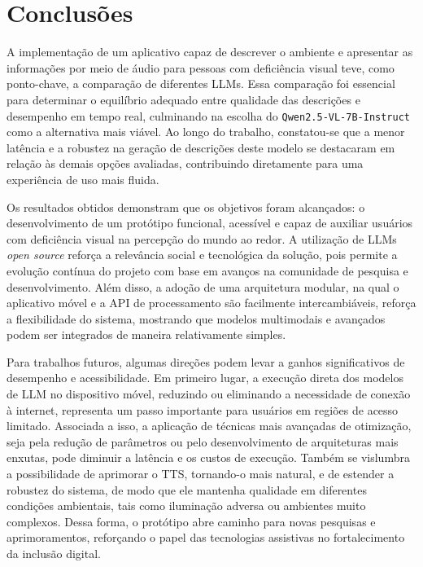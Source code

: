\chapter{Conclusões} \label{cap:05}

A implementação de um aplicativo capaz de descrever o ambiente e apresentar as informações por meio de áudio para pessoas com deficiência visual teve, como ponto-chave, a comparação de diferentes LLMs. Essa comparação foi essencial para determinar o equilíbrio adequado entre qualidade das descrições e desempenho em tempo real, culminando na escolha do \texttt{Qwen2.5-VL-7B-Instruct} como a alternativa mais viável. Ao longo do trabalho, constatou-se que a menor latência e a robustez na geração de descrições deste modelo se destacaram em relação às demais opções avaliadas, contribuindo diretamente para uma experiência de uso mais fluida.

Os resultados obtidos demonstram que os objetivos foram alcançados: o desenvolvimento de um protótipo funcional, acessível e capaz de auxiliar usuários com deficiência visual na percepção do mundo ao redor. A utilização de LLMs \textit{open source} reforça a relevância social e tecnológica da solução, pois permite a evolução contínua do projeto com base em avanços na comunidade de pesquisa e desenvolvimento. Além disso, a adoção de uma arquitetura modular, na qual o aplicativo móvel e a API de processamento são facilmente intercambiáveis, reforça a flexibilidade do sistema, mostrando que modelos multimodais e avançados podem ser integrados de maneira relativamente simples.

Para trabalhos futuros, algumas direções podem levar a ganhos significativos de desempenho e acessibilidade. Em primeiro lugar, a execução direta dos modelos de LLM no dispositivo móvel, reduzindo ou eliminando a necessidade de conexão à internet, representa um passo importante para usuários em regiões de acesso limitado. Associada a isso, a aplicação de técnicas mais avançadas de otimização, seja pela redução de parâmetros ou pelo desenvolvimento de arquiteturas mais enxutas, pode diminuir a latência e os custos de execução. Também se vislumbra a possibilidade de aprimorar o TTS, tornando-o mais natural, e de estender a robustez do sistema, de modo que ele mantenha qualidade em diferentes condições ambientais, tais como iluminação adversa ou ambientes muito complexos. Dessa forma, o protótipo abre caminho para novas pesquisas e aprimoramentos, reforçando o papel das tecnologias assistivas no fortalecimento da inclusão digital.